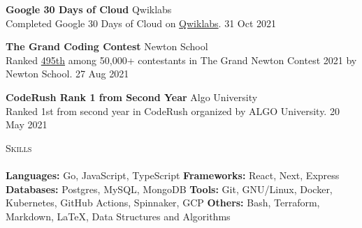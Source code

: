 \documentclass[a4paper]{article}
\newcommand{\lineunder} {
    \vspace*{-8pt} \\
    \hspace*{-18pt} \hrulefill \\
}
\newcommand{\header} [1] {
    {\hspace*{-18pt}\vspace*{6pt} \textsc{#1}}
    \vspace*{-6pt} \lineunder
}
\begin{document}
\textbf{Google 30 Days of Cloud} \hfill Qwiklabs\\
Completed Google 30 Days of Cloud on \href{https://www.qwiklabs.com/public_profiles/4c78c6d8-ad43-4991-b8fe-03e559c1bac5}{Qwiklabs}. \hfill 31 Oct 2021\\
\vspace*{1mm}

\textbf{The Grand Coding Contest} \hfill Newton School\\
Ranked \href{https://www.linkedin.com/posts/aynp_aryan-has-secured-rank-495-in-newtons-grand-activity-6841777869484642304-Za36}{495th} among 50,000+ contestants in The Grand Newton Contest 2021 by Newton School. \hfill 27 Aug 2021\\
\vspace*{1mm}


\textbf{CodeRush Rank 1 from Second Year} \hfill Algo University\\
Ranked 1st from second year in CodeRush organized by ALGO University. \hfill 20 May 2021\\
\vspace*{1.5mm}



\header{Skills}
\vspace{1mm}
\textbf{Languages:} Go, JavaScript, TypeScript
\quad \textbf{Frameworks:} React, Next, Express
\quad \textbf{Databases:} Postgres, MySQL, MongoDB
\quad \textbf{Tools:} Git, GNU/Linux, Docker, Kubernetes, GitHub Actions, Spinnaker, GCP
\quad \textbf{Others:} Bash, Terraform, Markdown, \LaTeX, Data Structures and Algorithms
\vspace{1.5mm}
\end{document}
